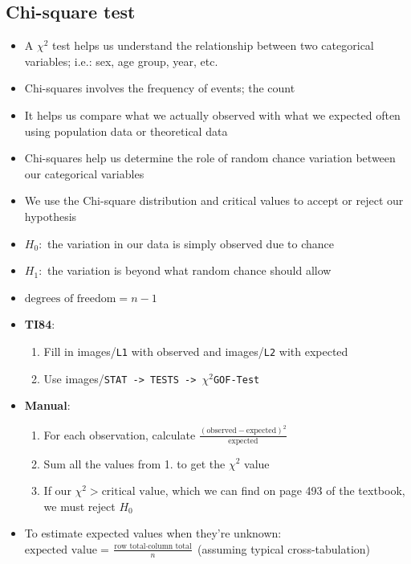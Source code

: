 \documentclass{article}
\newcommand{\code}[1]{images/\colorbox{light-gray}{\texttt{#1}}}
\begin{document}
\subsection{Chi-square test}

\begin{itemize}
    \item A $\chi ^2$ test helps us understand the relationship between two categorical variables; i.e.: sex, age group, year, etc.
    \item Chi-squares involves the frequency of events; the count
    \item It helps us compare what we actually observed with what we expected often using population data or theoretical data
    \item Chi-squares help us determine the role of random chance variation between our categorical variables
    \item We use the Chi-square distribution and critical values to accept or reject our hypothesis
    \item $H_0: $ the variation in our data is simply observed due to chance
    \item $H_1: $ the variation is beyond what random chance should allow
    \item $\text{degrees of freedom} = n-1$
    \item \textbf{TI84}:
    \begin{enumerate}
        \item Fill in \code{L1} with observed and \code{L2} with expected
        \item Use \code{STAT -> TESTS -> $\chi^2$GOF-Test}
    \end{enumerate}
    \item \textbf{Manual}:
    \begin{enumerate}
        \item For each observation, calculate 
        $\frac{(\text{observed} - \text{expected})^2}{\text{expected}}$
        \item Sum all the values from 1. to get the $\chi^2$ value
        \item If our $\chi^2>\text{critical value}$, which we can find on page 493 of the textbook, we must reject $H_0$
    \end{enumerate}
    \item To estimate expected values when they're unknown: $\text{expected value} = \frac{\text{row total} \cdot \text{column total}}{n}$ (assuming typical cross-tabulation)
\end{itemize}
\end{document}
